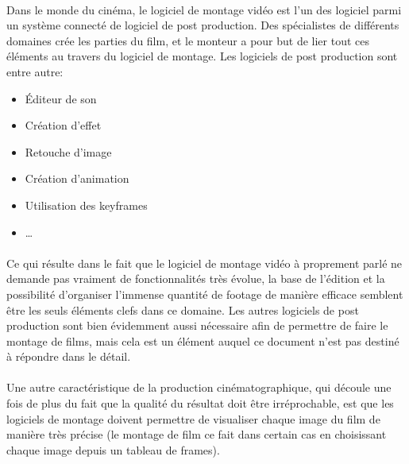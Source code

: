       \paragraph{}
        Dans le monde du cinéma, le logiciel de montage vidéo est l'un des logiciel
        parmi un système connecté de logiciel de post production. Des spécialistes de
        différents domaines crée les parties du film, et le monteur a pour but
        de lier tout ces éléments au travers du logiciel de montage. Les logiciels
        de post production sont entre autre:
        \begin{itemize}
          \item{Éditeur de son}
          \item{Création d'effet}
          \item{Retouche d'image}
          \item{Création d'animation}
          \item{Utilisation des keyframes}
          \item{\ldots}
        \end{itemize}

      \paragraph{}
        Ce qui résulte dans le fait que le logiciel de montage vidéo à proprement parlé ne
        demande pas vraiment de fonctionnalités très évolue, la base de l'édition
        et la possibilité d'organiser l'immense quantité de footage de manière efficace
        semblent être les seuls éléments clefs dans ce domaine. Les autres logiciels de
        post production sont bien évidemment aussi nécessaire afin de permettre de faire
        le montage de films, mais cela est un élément auquel ce document n'est pas destiné
        à répondre dans le détail.

      \paragraph{}
        Une autre caractéristique de la production cinématographique, qui découle une
        fois de plus du fait que la qualité du résultat doit être irréprochable, est
        que les logiciels de montage doivent permettre de visualiser chaque image du
        film de manière très précise (le montage de film ce fait dans certain cas en
        choisissant chaque image depuis un tableau de frames).


